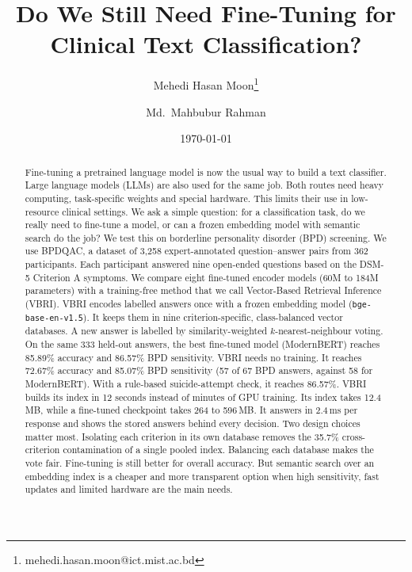 \documentclass[11pt]{article}
\title{\textbf{Do We Still Need Fine-Tuning for Clinical Text Classification?
}}
\author[1]{Mehedi Hasan Moon\thanks{mehedi.hasan.moon@ict.mist.ac.bd}}
\author[1]{Md.\ Mahbubur Rahman}
\affil[1]{Department of Computer Science and Engineering, Military Institute of Science and Technology,
Mirpur Cantonment, Dhaka 1216, Bangladesh}
\date{\today}
\newcommand{\vbri}{VBRI}
\newcommand{\bpdqac}{BPDQAC}
\newcommand{\dsmv}{DSM-5}
\begin{document}
\maketitle

\begin{abstract}
Fine-tuning a pretrained language model is now the usual way to build a text classifier. Large
language models (LLMs) are also used for the same job. Both routes need heavy computing, task-specific
weights and special hardware. This limits their use in low-resource clinical settings. We ask a
simple question: for a classification task, do we really need to fine-tune a model, or can a
frozen embedding model with semantic search do the job? We test this on borderline personality
disorder (BPD) screening. We use \bpdqac{}, a dataset of 3,258 expert-annotated question--answer
pairs from 362 participants. Each participant answered nine open-ended questions based on the
\dsmv{} Criterion A symptoms. We compare eight fine-tuned encoder models (60M to 184M parameters)
with a training-free method that we call Vector-Based Retrieval Inference (\vbri{}). \vbri{}
encodes labelled answers once with a frozen embedding model (\texttt{bge-base-en-v1.5}). It keeps
them in nine criterion-specific, class-balanced vector databases. A new answer is labelled by
similarity-weighted $k$-nearest-neighbour voting. On the same 333 held-out answers, the best
fine-tuned model (ModernBERT) reaches 85.89\% accuracy and 86.57\% BPD sensitivity. \vbri{} needs
no training. It reaches 72.67\% accuracy and 85.07\% BPD sensitivity (57 of 67 BPD answers, against
58 for ModernBERT). With a rule-based suicide-attempt check, it reaches 86.57\%. \vbri{} builds its
index in 12 seconds instead of minutes of GPU training. Its index takes 12.4\,MB, while a fine-tuned
checkpoint takes 264 to 596\,MB. It answers in 2.4\,ms per response and shows the stored answers
behind every decision. Two design choices matter most. Isolating each criterion in its own database
removes the 35.7\% cross-criterion contamination of a single pooled index. Balancing each database
makes the vote fair. Fine-tuning is still better for overall accuracy. But semantic search over an
embedding index is a cheaper and more transparent option when high sensitivity, fast updates and
limited hardware are the main needs.
\end{abstract}
\end{document}
